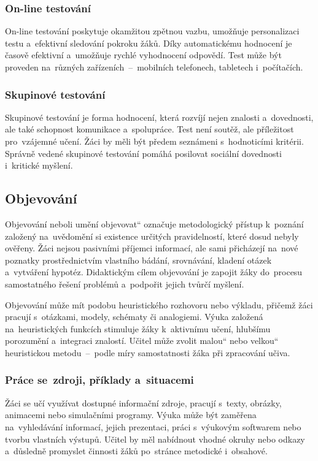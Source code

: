 \documentclass[male,czech,api_bc]{kitheses}
\begin{document}
\subsubsection{On-line testování}
On-line testování poskytuje okamžitou zpětnou vazbu, umožňuje personalizaci testu a~efektivní sledování pokroku žáků. Díky automatickému hodnocení je časově efektivní a~umožňuje rychlé vyhodnocení odpovědí. Test může být proveden na~různých zařízeních~--~mobilních telefonech, tabletech i~počítačích.

\subsubsection{Skupinové testování}
Skupinové testování je forma hodnocení, která rozvíjí nejen znalosti a~dovednosti, ale také schopnost komunikace a~spolupráce. Test není soutěž, ale příležitost pro~vzájemné učení. Žáci by měli být předem seznámeni s~hodnoticími kritérii. Správně vedené skupinové testování pomáhá posilovat sociální dovednosti i~kritické myšlení.

\subsection{Objevování}

Objevování neboli \quotedblbase umění objevovat`` označuje metodologický přístup k~poznání založený na~uvědomění si existence určitých pravidelností, které dosud nebyly ověřeny. Žáci nejsou pasivními příjemci informací, ale sami přicházejí na~nové poznatky prostřednictvím vlastního bádání, srovnávání, kladení otázek a~vytváření hypotéz. Didaktickým cílem objevování je zapojit žáky do~procesu samostatného řešení problémů a~podpořit jejich tvůrčí myšlení.

Objevování může mít podobu heuristického rozhovoru nebo výkladu, přičemž žáci pracují s~otázkami, modely, schématy či analogiemi. Výuka založená na~heuristických funkcích stimuluje žáky k~aktivnímu učení, hlubšímu porozumění a~integraci znalostí. Učitel může zvolit \quotedblbase malou`` nebo \quotedblbase velkou`` heuristickou metodu~--~podle míry samostatnosti žáka při zpracování učiva.

\subsubsection{Práce se~zdroji, příklady a~situacemi}

Žáci se učí využívat dostupné informační zdroje, pracují s~texty, obrázky, animacemi nebo simulačními programy. Výuka může být zaměřena na~vyhledávání informací, jejich prezentaci, práci s~výukovým softwarem nebo tvorbu vlastních výstupů. Učitel by měl nabídnout vhodné okruhy nebo odkazy a~důsledně promyslet činnosti žáků po~stránce metodické i~obsahové.
\end{document}
